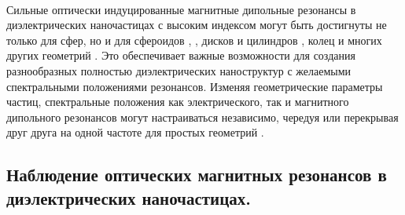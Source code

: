 \\
\hspace*{2mm}
Сильные оптически индуцированные магнитные дипольные резонансы в диэлектрических наночастицах с высоким индексом могут быть достигнуты не только для сфер, но и для сфероидов \cite{direcVisLight}, \cite{optScatShper}, дисков и цилиндров \cite{multLightScat}, колец \cite{contrMagnModes} и многих других геометрий \cite{nearInfrMR}. Это обеспечивает важные возможности для создания разнообразных полностью диэлектрических наноструктур с желаемыми спектральными положениями резонансов. Изменяя геометрические параметры частиц, спектральные положения как электрического, так и магнитного дипольного резонансов могут настраиваться независимо, чередуя или перекрывая друг друга на одной частоте для простых геометрий \cite{optScatDeilectrHightIndex}.


\subsection{Наблюдение оптических магнитных резонансов в диэлектрических наночастицах.}

